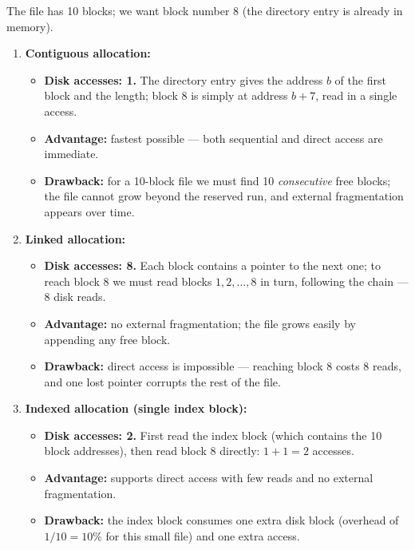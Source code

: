 \documentclass[11pt]{article}
\begin{document}
\begin{corrige}
The file has 10 blocks; we want block number 8 (the directory entry is already in memory).

\begin{enumerate}
\item \textbf{Contiguous allocation:}
\begin{itemize}
\item \textbf{Disk accesses: 1.} The directory entry gives the address $b$ of the first block and the length; block 8 is simply at address $b+7$, read in a single access.
\item \textbf{Advantage:} fastest possible — both sequential and direct access are immediate.
\item \textbf{Drawback:} for a 10-block file we must find 10 \emph{consecutive} free blocks; the file cannot grow beyond the reserved run, and external fragmentation appears over time.
\end{itemize}
\item \textbf{Linked allocation:}
\begin{itemize}
\item \textbf{Disk accesses: 8.} Each block contains a pointer to the next one; to reach block 8 we must read blocks $1, 2, \dots, 8$ in turn, following the chain — 8 disk reads.
\item \textbf{Advantage:} no external fragmentation; the file grows easily by appending any free block.
\item \textbf{Drawback:} direct access is impossible — reaching block 8 costs 8 reads, and one lost pointer corrupts the rest of the file.
\end{itemize}
\item \textbf{Indexed allocation (single index block):}
\begin{itemize}
\item \textbf{Disk accesses: 2.} First read the index block (which contains the 10 block addresses), then read block 8 directly: $1 + 1 = 2$ accesses.
\item \textbf{Advantage:} supports direct access with few reads and no external fragmentation.
\item \textbf{Drawback:} the index block consumes one extra disk block (overhead of $1/10 = 10\%$ for this small file) and one extra access.
\end{itemize}
\end{enumerate}


\end{corrige}
\end{document}
